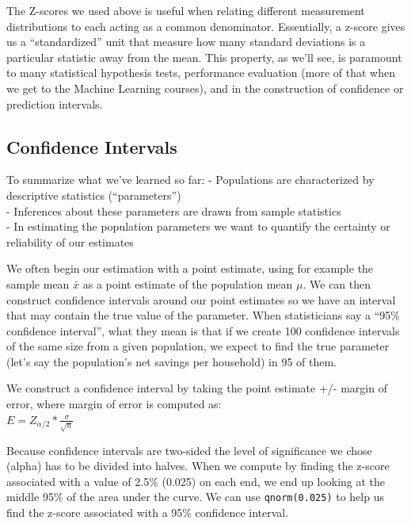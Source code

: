 \documentclass[]{article}
\newenvironment{Shaded}{\begin{snugshade}}{\end{snugshade}}
\newcommand{\CommentTok}[1]{\textcolor[rgb]{0.56,0.35,0.01}{\textit{#1}}}
\newcommand{\FloatTok}[1]{\textcolor[rgb]{0.00,0.00,0.81}{#1}}
\newcommand{\KeywordTok}[1]{\textcolor[rgb]{0.13,0.29,0.53}{\textbf{#1}}}
\newcommand{\NormalTok}[1]{#1}
\begin{document}
The Z-scores we used above is useful when relating different measurement
distributions to each acting as a common denominator. Essentially, a
z-score gives us a ``standardized'' unit that measure how many standard
deviations is a particular statistic away from the mean. This property,
as we'll see, is paramount to many statistical hypothesis tests,
performance evaluation (more of that when we get to the Machine Learning
courses), and in the construction of confidence or prediction intervals.

\hypertarget{confidence-intervals}{%
\subsection{Confidence Intervals}\label{confidence-intervals}}

To summarize what we've learned so far: - Populations are characterized
by descriptive statistics (``parameters'')\\
- Inferences about these parameters are drawn from sample statistics\\
- In estimating the population parameters we want to quantify the
certainty or reliability of our estimates

We often begin our estimation with a point estimate, using for example
the sample mean \(\bar{x}\) as a point estimate of the population mean
\(\mu\). We can then construct confidence intervals around our point
estimates so we have an interval that may contain the true value of the
parameter. When statisticians say a ``95\% confidence interval'', what
they mean is that if we create 100 confidence intervals of the same size
from a given population, we expect to find the true parameter (let's say
the population's net savings per household) in 95 of them.

We construct a confidence interval by taking the point estimate +/-
margin of error, where margin of error is computed as:\\
\(E = Z_{\alpha/2} * \frac{\sigma}{\sqrt{n}}\)

Because confidence intervals are two-sided the level of significance we
chose (alpha) has to be divided into halves. When we compute by finding
the z-score associated with a value of 2.5\% (0.025) on each end, we end
up looking at the middle 95\% of the area under the curve. We can use
\texttt{qnorm(0.025)} to help us find the z-score associated with a 95\%
confidence interval.

\begin{Shaded}
\end{Shaded}
\end{document}
